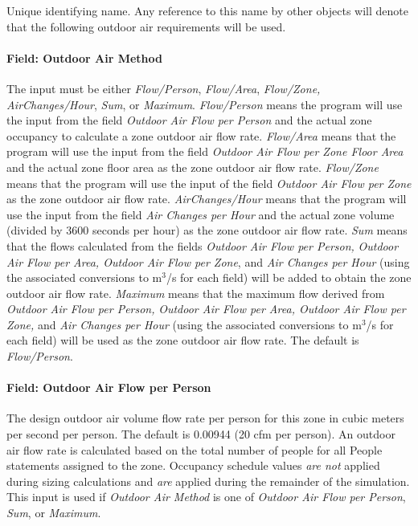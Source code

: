 Unique identifying name. Any reference to this name by other objects will denote that the following outdoor air requirements will be used.

\paragraph{Field: Outdoor Air Method}\label{field-outdoor-air-method}

The input must be either \emph{Flow/Person}, \emph{Flow/Area}, \emph{Flow/Zone, AirChanges/Hour}, \emph{Sum}, or \emph{Maximum}. \emph{Flow/Person} means the program will use the input from the field \emph{Outdoor Air Flow per Person} and the actual zone occupancy to calculate a zone outdoor air flow rate. \emph{Flow/Area} means that the program will use the input from the field \emph{Outdoor Air Flow per Zone Floor Area} and the actual zone floor area as the zone outdoor air flow rate. \emph{Flow/Zone} means that the program will use the input of the field \emph{Outdoor Air Flow per Zone} as the zone outdoor air flow rate. \emph{AirChanges/Hour} means that the program will use the input from the field \emph{Air Changes per Hour} and the actual zone volume (divided by 3600 seconds per hour) as the zone outdoor air flow rate. \emph{Sum} means that the flows calculated from the fields \emph{Outdoor Air Flow per Person,} \emph{Outdoor Air Flow per Area, Outdoor Air Flow per Zone}, and \emph{Air Changes per Hour} (using the associated conversions to m\(^{3}\)/s for each field) will be added to obtain the zone outdoor air flow rate. \emph{Maximum} means that the maximum flow derived from \emph{Outdoor Air Flow per Person,} \emph{Outdoor Air Flow per Area, Outdoor Air Flow per Zone,} and \emph{Air Changes per Hour} (using the associated conversions to m\(^{3}\)/s for each field) will be used as the zone outdoor air flow rate. The default is \emph{Flow/Person}.

\paragraph{Field: Outdoor Air Flow per Person}\label{field-outdoor-air-flow-per-person}

The design outdoor air volume flow rate per person for this zone in cubic meters per second per person. The default is 0.00944 (20 cfm per person). An outdoor air flow rate is calculated based on the total number of people for all People statements assigned to the zone. Occupancy schedule values \emph{are not} applied during sizing calculations and \emph{are} applied during the remainder of the simulation. This input is used if \emph{Outdoor Air Method} is one of \emph{Outdoor Air Flow per Person}, \emph{Sum}, or \emph{Maximum}.

